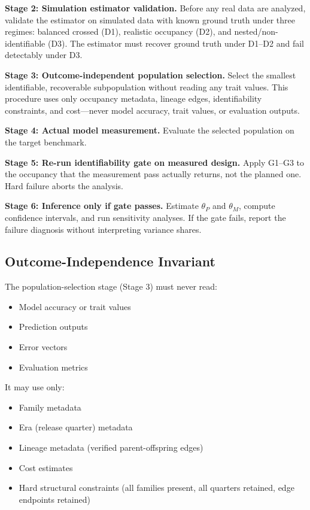\documentclass[journal]{IEEEtran}
\begin{document}
\textbf{Stage 2: Simulation estimator validation.} Before any real data are analyzed, validate the estimator on simulated data with known ground truth under three regimes: balanced crossed (D1), realistic occupancy (D2), and nested/non-identifiable (D3). The estimator must recover ground truth under D1--D2 and fail detectably under D3.

\textbf{Stage 3: Outcome-independent population selection.} Select the smallest identifiable, recoverable subpopulation without reading any trait values. This procedure uses only occupancy metadata, lineage edges, identifiability constraints, and cost---never model accuracy, trait values, or evaluation outputs.

\textbf{Stage 4: Actual model measurement.} Evaluate the selected population on the target benchmark.

\textbf{Stage 5: Re-run identifiability gate on measured design.} Apply G1--G3 to the occupancy that the measurement pass actually returns, not the planned one. Hard failure aborts the analysis.

\textbf{Stage 6: Inference only if gate passes.} Estimate $\theta_P$ and $\theta_M$, compute confidence intervals, and run sensitivity analyses. If the gate fails, report the failure diagnosis without interpreting variance shares.

\subsection{Outcome-Independence Invariant}

The population-selection stage (Stage 3) must never read:
\begin{itemize}
\item Model accuracy or trait values
\item Prediction outputs
\item Error vectors
\item Evaluation metrics
\end{itemize}

It may use only:
\begin{itemize}
\item Family metadata
\item Era (release quarter) metadata
\item Lineage metadata (verified parent-offspring edges)
\item Cost estimates
\item Hard structural constraints (all families present, all quarters retained, edge endpoints retained)
\end{itemize}
\end{document}

